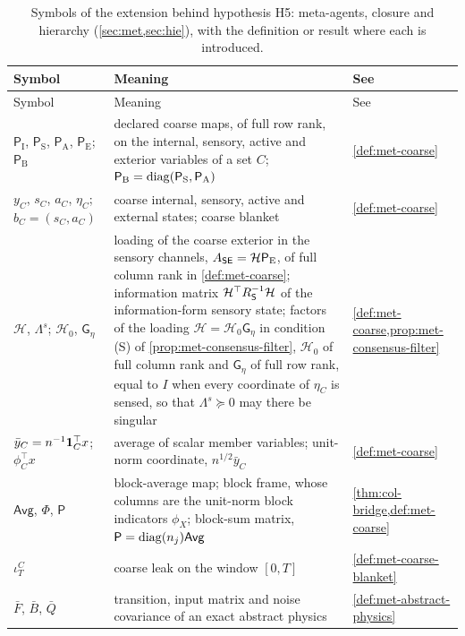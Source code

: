 \begingroup
\small
\setlength{\tabcolsep}{4pt}
\begin{longtable}{@{}>{\raggedright\arraybackslash}p{}>{\raggedright\arraybackslash}p{}>{\raggedright\arraybackslash}p{}@{}}
\caption{Symbols of the extension behind hypothesis H5: meta-agents, closure and hierarchy (\cref{sec:met,sec:hie}), with the definition or result where each is introduced.}\label{tab:not-extension}\\
\toprule
Symbol & Meaning & See\\
\midrule
\endfirsthead
\toprule
Symbol & Meaning & See\\
\midrule
\endhead
\bottomrule
\endfoot
$\mathsf P_{\mathrm I}$, $\mathsf P_{\mathrm S}$, $\mathsf P_{\mathrm A}$, $\mathsf P_{\mathrm E}$; $\mathsf P_{\mathrm B}$ & declared coarse maps, of full row rank, on the internal, sensory, active and exterior variables of a set $C$; $\mathsf P_{\mathrm B}=\operatorname{diag}(\mathsf P_{\mathrm S},\mathsf P_{\mathrm A})$ & \cref{def:met-coarse}\\
$y_C$, $s_C$, $a_C$, $\eta_C$; $b_C=(s_C,a_C)$ & coarse internal, sensory, active and external states; coarse blanket & \cref{def:met-coarse}\\
$\mathcal H$, $\Lambda^s$; $\mathcal H_0$, $\mathsf G_\eta$ & loading of the coarse exterior in the sensory channels, $A_{\mathsf{S}\mathsf{E}}=\mathcal H\mathsf P_{\mathrm E}$, of full column rank in \cref{def:met-coarse}; information matrix $\mathcal H^\top R_{\mathsf{S}}^{-1}\mathcal H$ of the information-form sensory state; factors of the loading $\mathcal H=\mathcal H_0\mathsf G_\eta$ in condition (S) of \cref{prop:met-consensus-filter}, $\mathcal H_0$ of full column rank and $\mathsf G_\eta$ of full row rank, equal to $I$ when every coordinate of $\eta_C$ is sensed, so that $\Lambda^s\succeq0$ may there be singular & \cref{def:met-coarse,prop:met-consensus-filter}\\
$\bar y_C=n^{-1}\mathbf{1}_C^\top x$; $\phi_C^\top x$ & average of scalar member variables; unit-norm coordinate, $n^{1/2}\bar y_C$ & \cref{def:met-coarse}\\
$\mathsf{Avg}$, $\Phi$, $\mathsf P$ & block-average map; block frame, whose columns are the unit-norm block indicators $\phi_X$; block-sum matrix, $\mathsf P=\operatorname{diag}(n_j)\mathsf{Avg}$ & \cref{thm:col-bridge,def:met-coarse}\\
$\iota^C_T$ & coarse leak on the window $[0,T]$ & \cref{def:met-coarse-blanket}\\
$\bar F$, $\bar B$, $\bar Q$ & transition, input matrix and noise covariance of an exact abstract physics & \cref{def:met-abstract-physics}\\

\end{longtable}
